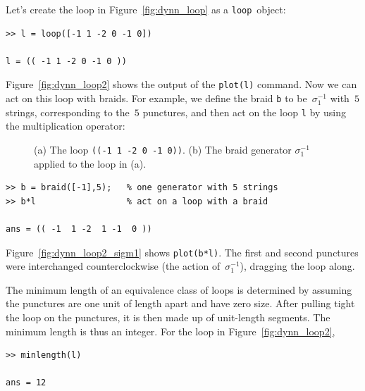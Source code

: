 \documentclass[12pt]{article}
\newcommand{\loopc}{\texttt{loop}}%
\begin{document}
Let's create the loop in Figure~\ref{fig:dynn_loop} as a \loopc\ object:
\begin{lstlisting}[frame=single,framerule=0pt]
>> l = loop([-1 1 -2 0 -1 0])

l = (( -1 1 -2 0 -1 0 ))
\end{lstlisting}
Figure~\ref{fig:dynn_loop2} shows the output of the
\lstinline{plot(l)} command.  Now we can act on this loop with braids.
For example, we define the braid \lstinline{b} to be~$\sigma_1^{-1}$
with~$5$ strings, corresponding to the~$5$ punctures, and then act on
the loop \lstinline{l} by using the multiplication operator:
%
\begin{figure}
\begin{center}
\hspace{1em}
\end{center}
\caption{(a) The loop \texttt{((-1 1 -2 0 -1 0))}.  (b) The braid generator
  $\sigma_1^{-1}$ applied to the loop in (a).}
\end{figure}
%
\begin{lstlisting}[frame=single,framerule=0pt]
>> b = braid([-1],5);   % one generator with 5 strings
>> b*l                  % act on a loop with a braid

ans = (( -1  1 -2  1 -1  0 ))
\end{lstlisting}
Figure~\ref{fig:dynn_loop2_sigm1} shows \lstinline{plot(b*l)}.  The
first and second punctures were interchanged counterclockwise (the
action of~$\sigma_1^{-1}$), dragging the loop along.

The minimum length of an equivalence class of loops is determined by
assuming the punctures are one unit of length apart and have zero
size.  After pulling tight the loop on the punctures, it is then made
up of unit-length segments.  The minimum length is thus an integer.
For the loop in Figure~\ref{fig:dynn_loop2},
\begin{lstlisting}[frame=single,framerule=0pt]
>> minlength(l)

ans = 12
\end{lstlisting}
\end{document}
